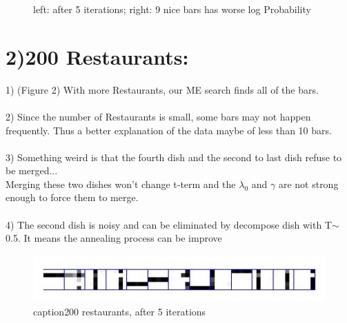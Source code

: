 \documentclass{article}
\begin{document}
\begin{spacing}{1.1}
\begin{figure}
\begin{tabular}{cc}
        \end{tabular}
    \caption{left: after 5 iterations; right: 9 nice bars has worse log Probability}
    \label{fig:by:table} 
\end{figure}

\newpage
\section{2)200 Restaurants:}
1) (Figure 2) With more Restaurants, our ME search finds all of the bars.\\ \\
2) Since the number of Restaurants is small, some bars may not happen frequently. Thus a better explanation of the data maybe of less than 10 bars.\\ \\
3) Something weird is that the fourth dish and the second to last dish refuse to be merged...\\
Merging these two dishes won't change t-term and the $\lambda_{0}$ and $\gamma$ are not strong enough to force them to merge.\\ \\
4) The second dish is noisy and can be eliminated by decompose dish with T$\sim$0.5. It means the annealing process can be improve\\
\begin{figure}
 \centering
 \includegraphics{200_bias_05_bar.jpg}
 caption{200 restaurants, after 5 iterations}   
\end{figure}

\end{spacing}
\end{document}

